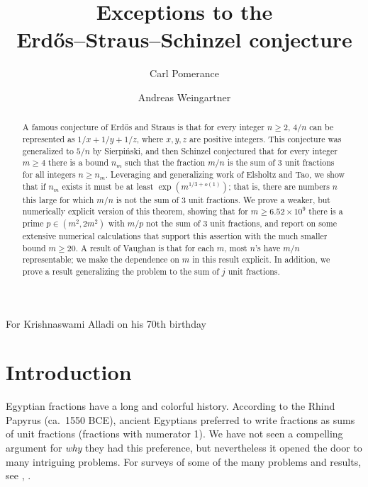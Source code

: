 \documentclass[12pt]{amsart}
\theoremstyle{definition}
\theoremstyle{remark}
\numberwithin{equation}{section}
\begin{document}
\title[Exceptions to the Erd\H os--Straus--Schinzel conjecture]{Exceptions to the\\ Erd\H os--Straus--Schinzel conjecture}
\author{Carl Pomerance}
\address{Department of Mathematics, Dartmouth College\\
Hanover, NH 03755}
\author{Andreas Weingartner}
\address{Department of Mathematics, Southern Utah University\\
351 University Boulevard\\
Cedar City, UT 84720}
\maketitle


{\it\centerline{For Krishnaswami Alladi on his 70th birthday}}

\begin{abstract}
A famous conjecture of Erd\H os and Straus is that for every integer $n\ge2$,
$4/n$ can be represented as $1/x+1/y+1/z$, where $x,y,z$ are positive integers.
This conjecture was generalized to $5/n$ by Sierpi\'nski, and then Schinzel
conjectured that for every integer $m\ge4$ there is a bound $n_m$ such that
the fraction $m/n$ is the sum of 3 unit fractions for all integers $n\ge n_m$.
Leveraging and generalizing work of Elsholtz and Tao, we show that if $n_m$ exists
it must be at least $\exp(m^{1/3+o(1)})$; that is, there are numbers $n$ this large
for which $m/n$ is not the sum of 3 unit fractions.  We prove a weaker, but numerically explicit
version of this theorem, showing that for $m\ge 6.52\times10^9$ there is a prime 
$p\in(m^2,2m^2)$ with $m/p$ not the sum of 3 unit fractions, and report on some
extensive numerical calculations that support this assertion with the much smaller bound $m\ge20$.  A result of Vaughan is  that for each $m$,
most $n$'s have $m/n$ representable; we make the dependence on $m$ in this result
explicit.  In addition,  we prove a result generalizing the problem
to the sum of $j$ unit fractions.
\end{abstract}

\section{Introduction}
Egyptian fractions have a long
and colorful history.  According to the Rhind Papyrus (ca.\ 1550 BCE), ancient Egyptians preferred
to write fractions as sums of unit fractions (fractions with numerator 1).  We have
not seen a compelling argument for {\it why} they had this preference, but nevertheless
it opened the door to many intriguing problems.   For surveys of some of the many problems and results,
see \cite[Ch. 4]{EG}, \cite[Sec. D11]{Gu}.
\end{document}
